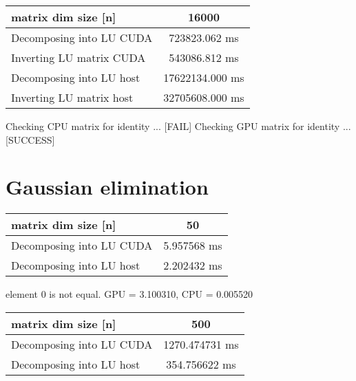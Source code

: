 
\begin{tabular}{|l|c|}
	\hline
	matrix dim size [n] & 16000 \\
	\hline
	Decomposing into LU CUDA & 723823.062 ms\\
	Inverting LU matrix CUDA & 543086.812 ms\\
	\hline
	Decomposing into LU host & 17622134.000 ms\\
	Inverting LU matrix host & 32705608.000 ms\\		
	\hline
\end{tabular}

Checking CPU matrix for identity ... [FAIL]
Checking GPU matrix for identity ... [SUCCESS]

\section{Gaussian elimination}

\begin{tabular}{|l|c|}
	\hline
	matrix dim size [n] & 50 \\
	\hline
	Decomposing into LU CUDA & 5.957568 ms\\
	\hline
	Decomposing into LU host &  2.202432 ms\\	
	\hline
\end{tabular}

element 0 is not equal. GPU = 3.100310, CPU = 0.005520

\begin{tabular}{|l|c|}
	\hline
	matrix dim size [n] & 500 \\
	\hline
	Decomposing into LU CUDA & 1270.474731 ms\\
	\hline
	Decomposing into LU host &  354.756622 ms\\	
	\hline
\end{tabular}

